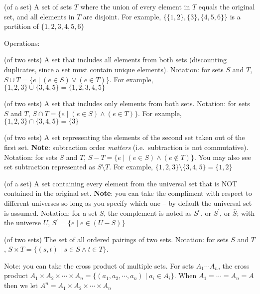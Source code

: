 \documentclass[main.tex]{subfiles}
\begin{document}
\begin{defn}[Partition]
	(of a set) A set of sets \(T\) where the union of every element in \(T\) equals the original set, and all elements in \(T\) are disjoint. For example, \(\{\{1,2\}, \{3\}, \{4,5,6\}\}\) is a partition of \(\{1,2,3,4,5,6\}\)
\end{defn}

Operations:

\begin{defn}[Union]
	(of two sets) A set that includes all elements from both sets (discounting duplicates, since a set must contain unique elements). Notation: for sets \(S\) and \(T\), \(S \cup T = \{e \mid (e \in S) \lor (e \in T)\}\). For example, \(\{1,2,3\} \cup \{3,4,5\} = \{1,2,3,4,5\}\)
\end{defn}

\begin{defn}[Intersection]
	(of two sets) A set that includes only elements from both sets. Notation: for sets \(S\) and \(T\), \(S \cap T = \{e \mid (e \in S) \land (e \in T)\}\). For example, \(\{1,2,3\} \cap \{3,4,5\} = \{3\}\)
\end{defn}

\begin{defn}[Subtraction]
	(of two sets) A set representing the elements of the second set taken out of the first set. \textbf{Note}: subtraction order \textit{matters} (i.e.\ subtraction is not commutative). Notation: for sets \(S\) and \(T\), \(S - T = \{e \mid (e \in S) \land (e \not\in T)\}\). You may also see set subtraction represented as \(S \setminus T\). For example, \(\{1,2,3\} \setminus \{3,4,5\} = \{1,2\}\)
\end{defn}

\begin{defn}[Compliment]
	(of a set) A set containing every element from the universal set that is NOT contained in the original set. \textbf{Note}: you can take the compliment with respect to different universes so long as you specify which one -- by default the universal set is assumed. Notation: for a set \(S\), the complement is noted as \(S^{\mathsf{c}}\), or \(S^{'}\), or \(\overline{S}\); with the universe \(U\), \(S^{'} = \{e \mid e \in (U - S)\}\)
\end{defn}

\begin{defn}
	(of two sets) The set of all ordered pairings of two sets. Notation: for sets \(S\) and \(T\), \(S \times T = \{(s,t) \mid s \in S \land t \in T\}\).
	
	Note: you can take the cross product of multiple sets. For sets \(A_1 \cdots A_n\), the cross product \(A_1 \times A_2 \times \cdots \times A_n = \{(a_1, a_2, \cdots, a_n) \mid a_i \in A_i\}\). When \(A_1 = \cdots = A_n = A\) then we let \(A^n = A_1 \times A_2 \times \cdots \times A_n\)
\end{defn}
\end{document}
